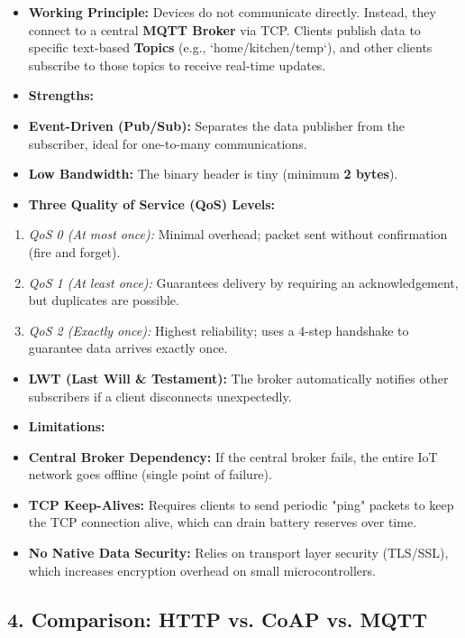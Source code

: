 \begin{itemize}
  \item   \textbf{Working Principle:} Devices do not communicate directly. Instead, they connect to a central \textbf{MQTT Broker} via TCP. Clients publish data to specific text-based \textbf{Topics} (e.g., `home/kitchen/temp`), and other clients subscribe to those topics to receive real-time updates.
  \item   \textbf{Strengths:}
  \item   \textbf{Event-Driven (Pub/Sub):} Separates the data publisher from the subscriber, ideal for one-to-many communications.
  \item   \textbf{Low Bandwidth:} The binary header is tiny (minimum \textbf{2 bytes}).
  \item   \textbf{Three Quality of Service (QoS) Levels:}
\end{itemize}
\begin{enumerate}
  \item \textit{QoS 0 (At most once):} Minimal overhead; packet sent without confirmation (fire and forget).
  \item \textit{QoS 1 (At least once):} Guarantees delivery by requiring an acknowledgement, but duplicates are possible.
  \item \textit{QoS 2 (Exactly once):} Highest reliability; uses a 4-step handshake to guarantee data arrives exactly once.
\end{enumerate}
\begin{itemize}
  \item   \textbf{LWT (Last Will \& Testament):} The broker automatically notifies other subscribers if a client disconnects unexpectedly.
  \item   \textbf{Limitations:}
  \item   \textbf{Central Broker Dependency:} If the central broker fails, the entire IoT network goes offline (single point of failure).
  \item   \textbf{TCP Keep-Alives:} Requires clients to send periodic "ping" packets to keep the TCP connection alive, which can drain battery reserves over time.
  \item   \textbf{No Native Data Security:} Relies on transport layer security (TLS/SSL), which increases encryption overhead on small microcontrollers.
\end{itemize}


\subsection{4. Comparison: HTTP vs. CoAP vs. MQTT}

